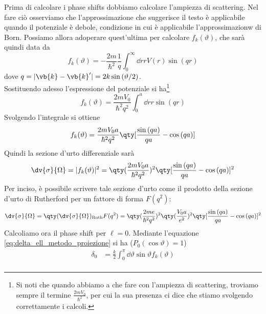 \begin{soluzione}
\begin{equation}
   \end{equation}
   Prima di calcolare i phase shifts dobbiamo calcolare l'ampiezza di scattering. Nel fare ciò osserviamo che l'approssimazione che suggerisce il testo è applicabile quando il potenziale è debole, condizione in cui è applicabile l'approssimazionw di Born. Possiamo allora adoperare quest'ultima per calcolare $f_k(\vartheta)$, che sarà quindi data da
   \begin{equation*}
      f_k(\vartheta)
      =-\frac{2m}{\hbar^2} \frac{1}{q} \int_{0}^{\infty} \dd{r} r V(r) \sin{(qr)}
   \end{equation*}
   dove $q=|\vb{k} - \vb{k}'|=2k \sin{(\vartheta/2)}$.\\ Sostituendo adesso l'espressione del potenziale si ha\footnote{Si noti che quando abbiamo a che fare con l'ampiezza di scattering, troviamo sempre il termine $\frac{2m V_0}{\hbar^2}$, per cui la sua presenza ci dice che stiamo svolgendo correttamente i calcoli.}
   \begin{equation*}
      f_k(\vartheta)
      =\frac{2m V_0}{\hbar^2 q^2} \int_{0}^{a} \dd{r} r \sin{(qr)}
   \end{equation*}
   Svolgendo l'integrale si ottiene
   \begin{equation*}
      f_k(\vartheta)
      =\frac{2m V_0 a}{\hbar^2 q^2} \qty[ \frac{\sin{(qa)}}{qa} - \cos{(qa)} ]
   \end{equation*}
   Quindi la sezione d'urto differenziale sarà
   \begin{equation*}
      \dv{\sigma}{\Omega}
      =| f_k(\vartheta) |^2
      =\qty( \frac{2m V_0 a}{\hbar^2 q^2} )^2 \qty[ \frac{\sin{(qa)}}{qa} - \cos{(qa)} ]^2
   \end{equation*}
   Per inciso, è possibile scrivere tale sezione d'urto come il prodotto della sezione d'urto di Rutherford per un fattore di forma $F(q^2)$:
   \begin{equation*}
      \dv{\sigma}{\Omega}
      =\qty( \dv{\sigma}{\Omega} )_{\rm Ruth} F(q^2)
      =\qty( \frac{2m e}{\hbar^2 q^2} )^2 \qty( \frac{ V_0 a}{e^2} )^2 \qty[ \frac{\sin{(qa)}}{qa} - \cos{(qa)} ]^2
   \end{equation*}
   Calcoliamo ora il phase shift per $\ell=0$. Mediante l'equazione \eqref{eq:delta_ell_metodo_proiezione} si ha ($P_0(\cos{\vartheta})=1$)
   \begin{equation*}
      \begin{split}
         \delta_0
         & =\frac{k}{2} \int_{0}^{\pi} \dd{\vartheta} \sin{\vartheta} f_k(\vartheta)
         \\

\end{split}
\end{equation*}
\end{soluzione}
